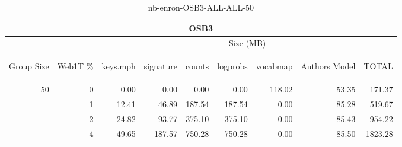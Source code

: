 \begin{center}
\begin{table}[htbp] 
 \begin{center}
\begin{tabular}{ | r | r | r | r | r | r | r | r | r |}
\hline
\multicolumn{9}{|c|}{OSB3}\\
\hline
 & & \multicolumn{7}{|c|}{Size (MB)}\\ \cline{3-9}
\begin{sideways}Group Size\end{sideways} & \begin{sideways}Web1T \% \end{sideways} & \begin{sideways}keys.mph\end{sideways} & \begin{sideways}signature\end{sideways} & \begin{sideways}counts\end{sideways} & \begin{sideways}logprobs\end{sideways} & \begin{sideways}vocabmap\end{sideways} & \begin{sideways}Authors Model \end{sideways} & \begin{sideways}TOTAL\end{sideways}\\
\hline
\multirow{3}{*}{50}
 & 0 & 0.00 & 0.00 & 0.00 & 0.00 & 118.02 & 53.35 & 171.37\\ \cline{2-9}
 & 1 & 12.41 & 46.89 & 187.54 & 187.54 & 0.00 & 85.28 & 519.67\\ \cline{2-9}
 & 2 & 24.82 & 93.77 & 375.10 & 375.10 & 0.00 & 85.43 & 954.22\\ \cline{2-9}
 & 4 & 49.65 & 187.57 & 750.28 & 750.28 & 0.00 & 85.50 & 1823.28\\ \cline{2-9}
\hline
\end{tabular}
\caption{nb-enron-OSB3-ALL-ALL-50}
\label{table:nb-enron-OSB3-ALL-ALL-50}
\end{center}
 \end{table}
\end{center}

